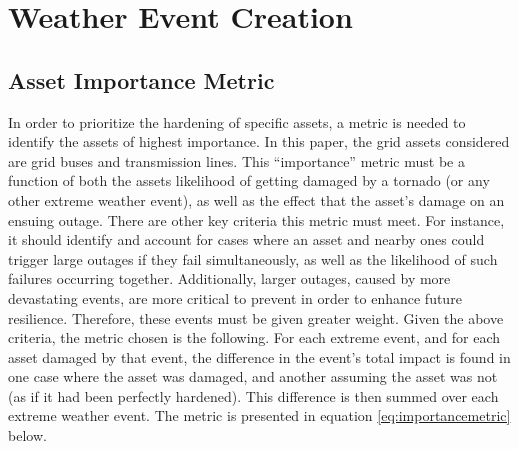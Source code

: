 \documentclass[12pt]{article}
\begin{document}
\section{Weather Event Creation}
\subsection{Asset Importance Metric}
In order to prioritize the hardening of specific assets, a metric is needed to identify the assets of highest importance. In this paper, the grid assets considered are grid buses and transmission lines. This “importance” metric must be a function of both the assets likelihood of getting damaged by a tornado (or any other extreme weather event), as well as the effect that the asset’s damage on an ensuing outage. There are other key criteria this metric must meet. For instance, it should identify and account for cases where an asset and nearby ones could trigger large outages if they fail simultaneously, as well as the likelihood of such failures occurring together. Additionally, larger outages, caused by more devastating events, are more critical to prevent in order to enhance future resilience. Therefore, these events must be given greater weight.
Given the above criteria, the metric chosen is the following. For each extreme event, and for each asset damaged by that event, the difference in the event’s total impact is found in one case where the asset was damaged, and another assuming the asset was not (as if it had been perfectly hardened). This difference is then summed over each extreme weather event. The metric is presented in equation \eqref{eq:importancemetric} below. 
\end{document}
